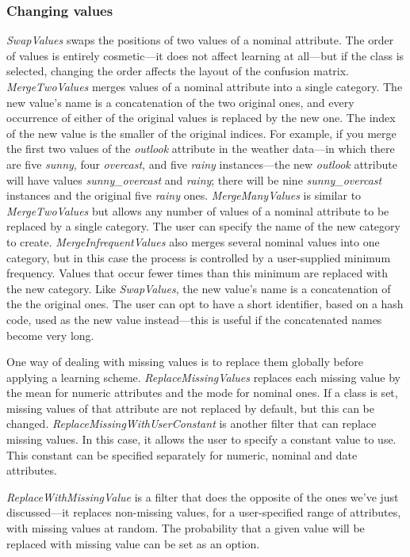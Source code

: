 \subsubsection{Changing values}

\textit{SwapValues} swaps the positions of two values of a nominal
attribute. The order of values is entirely cosmetic—it does not affect
learning at all—but if the class is selected, changing the order
affects the layout of the confusion matrix. \textit{MergeTwoValues}
merges values of a nominal attribute into a single category. The new
value’s name is a concatenation of the two original ones, and every
occurrence of either of the original values is replaced by the new
one. The index of the new value is the smaller of the original
indices. For example, if you merge the first two values of the
\textit{outlook} attribute in the weather data---in which there are
five \textit{sunny}, four \textit{overcast}, and five \textit{rainy}
instances---the new \textit{outlook} attribute will have values
\textit{sunny\_overcast} and \textit{rainy}; there will be nine
\textit{sunny\_overcast} instances and the original five \textit{rainy}
ones. \textit{MergeManyValues} is similar to \textit{MergeTwoValues}
but allows any number of values of a nominal attribute to be replaced
by a single category. The user can specify the name of the new
category to create. \textit{MergeInfrequentValues} also merges several
nominal values into one category, but in this case the process is
controlled by a user-supplied minimum frequency. Values that occur
fewer times than this minimum are replaced with the new category. Like
\textit{SwapValues}, the new value's name is a concatenation of the
the original ones. The user can opt to have a short identifier, based
on a hash code, used as the new value instead---this is useful if the
concatenated names become very long.

One way of dealing with missing values is to replace them globally
before applying a learning scheme. \textit{ReplaceMissingValues}
replaces each missing value by the mean for numeric attributes and the
mode for nominal ones. If a class is set, missing values of that
attribute are not replaced by default, but this can be
changed. \textit{ReplaceMissingWithUserConstant} is another filter
that can replace missing values. In this case, it allows the user to
specify a constant value to use. This constant can be specified
separately for numeric, nominal and date attributes.

\textit{ReplaceWithMissingValue} is a filter that does the opposite of
the ones we've just discussed---it replaces non-missing values, for a
user-specified range of attributes, with missing values at random. The
probability that a given value will be replaced with missing value can
be set as an option.

